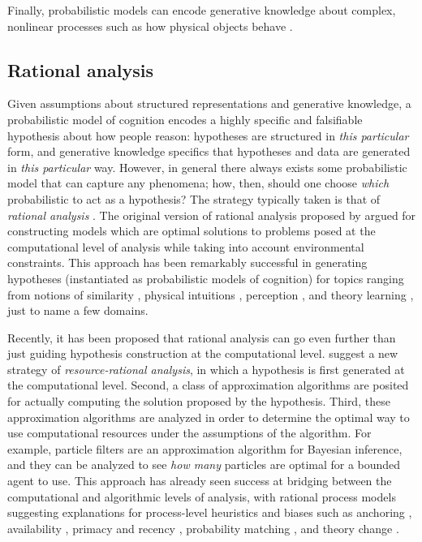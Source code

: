 \documentclass[12pt]{article}
\begin{document}
Finally, probabilistic models can encode generative knowledge about complex, nonlinear processes such as how physical objects behave \citep{Teglas2011,Sanborn2013,Smith2012}.

\subsection*{Rational analysis}

Given assumptions about structured representations and generative knowledge, a probabilistic model of cognition encodes a highly specific and falsifiable hypothesis about how people reason: hypotheses are structured in \textit{this particular} form, and generative knowledge specifics that hypotheses and data are generated in \textit{this particular} way. However, in general there always exists some probabilistic model that can capture any phenomena; how, then, should one choose \textit{which} probabilistic to act as a hypothesis? The strategy typically taken is that of \textit{rational analysis} \citep{Anderson1990}. The original version of rational analysis proposed by \cite{Anderson1990} argued for constructing models which are optimal solutions to problems posed at the computational level of analysis \citep{Marr1971} while taking into account environmental constraints. This approach has been remarkably successful in generating hypotheses (instantiated as probabilistic models of cognition) for topics ranging from notions of similarity \citep{Tenenbaum2001}, physical intuitions \citep{Teglas2011,Sanborn2013}, perception \citep{Weiss2002,Ernst2002,Kording2004,Yuille2006}, and theory learning \citep{Kemp2007,Griffiths2009,Kemp2010,Ullman2012}, just to name a few domains.

Recently, it has been proposed that rational analysis can go even further than just guiding hypothesis construction at the computational level. \cite{Griffiths2015} suggest a new strategy of \textit{resource-rational analysis}, in which a hypothesis is first generated at the computational level. Second, a class of approximation algorithms are posited for actually computing the solution proposed by the hypothesis. Third, these approximation algorithms are analyzed in order to determine the optimal way to use computational resources under the assumptions of the algorithm. For example, particle filters are an approximation algorithm for Bayesian inference, and they can be analyzed to see \textit{how many} particles are optimal for a bounded agent to use. This approach has already seen success at bridging between the computational and algorithmic levels of analysis, with rational process models suggesting explanations for process-level heuristics and biases such as anchoring \citep{Lieder2012}, availability \citep{Lieder2014}, primacy and recency \citep{Abbott2011}, probability matching \citep{Vul2014}, and theory change \citep{Ullman2012}.
\end{document}
